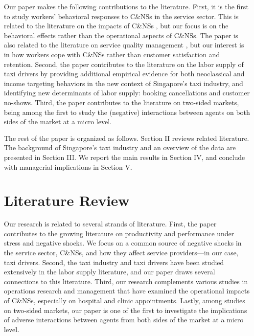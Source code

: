 \documentclass[reviewmode]{AEA}
\begin{document}
Our paper makes the following contributions to the literature. First, it is the first to study workers' behavioral responses to C\&NSs in the service sector. This is related to the literature on the impacts of C\&NSs \citep{moore2001time,patrick2008reducing,norris2014empirical,feldman2014appointment}, but our focus is on the behavioral effects rather than the operational aspects of C\&NSs. The paper is also related to the literature on service quality management \citep{cohen2018frustration}, but our interest is in how workers cope with C\&NSs rather than customer satisfaction and retention. Second, the paper contributes to the literature on the labor supply of taxi drivers by providing additional empirical evidence for both neoclassical and income targeting behaviors in the new context of Singapore's taxi industry, and identifying new determinants of labor supply: booking cancellations and customer no-shows. Third, the paper contributes to the literature on two-sided markets, being among the first to study the (negative) interactions between agents on both sides of the market at a micro level.


The rest of the paper is organized as follows. Section II reviews related literature. The background of Singapore's taxi industry and an overview of the data are presented in Section III.  We report the main results in Section IV, 
and conclude with  managerial implications in Section V.

\section{Literature Review}

Our research is related to several strands of literature. First, the paper contributes to the growing literature on productivity and performance under stress and negative shocks. We focus on a common source of negative shocks in the service sector, C\&NSs, and how they affect service providers---in our case, taxi drivers. Second, the taxi industry and taxi drivers  have been studied extensively in the labor supply literature, and our paper draws several connections to this literature. Third, our research complements various studies in operations research and management that have examined the operational impacts of C\&NSs, especially on hospital and clinic appointments. Lastly, among studies on two-sided markets, our paper is one of the first to investigate the implications of adverse interactions between agents from both sides of the market at a micro level.
\end{document}
